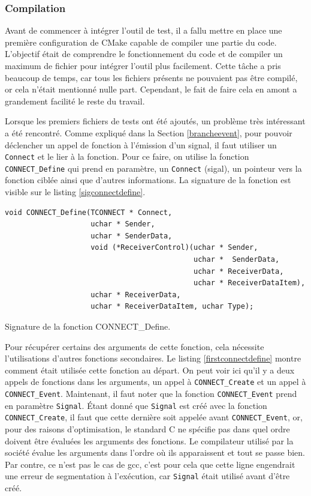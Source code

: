 \documentclass[a4paper]{article}
\begin{document}
\subsubsection*{Compilation}

Avant de commencer à intégrer l'outil de test, il a fallu mettre en place une
première configuration de CMake capable de compiler une partie du code.
L'objectif était de comprendre le fonctionnement du code et de compiler un
maximum de fichier pour intégrer l'outil plus facilement. Cette tâche a pris
beaucoup de temps, car tous les fichiers présents ne pouvaient pas être compilé,
or cela n'était mentionné nulle part. Cependant, le fait de faire cela en amont a
grandement facilité le reste du travail.

Lorsque les premiers fichiers de tests ont été ajoutés, un problème très
intéressant a été rencontré. Comme expliqué dans la Section \ref{brancheevent},
pour pouvoir déclencher un appel de fonction à l'émission d'un signal, il faut
utiliser un \verb|Connect| et le lier à la fonction. Pour ce faire, on utilise
la fonction \verb|CONNECT_Define| qui prend en paramètre, un \verb|Connect|
(sigal), un pointeur vers la fonction ciblée ainsi que d'autres informations. La
signature de la fonction est visible sur le listing \ref{sigconnectdefine}.

\begin{listing}[ht!]
\begin{verbatim}
void CONNECT_Define(TCONNECT * Connect,
                    uchar * Sender,
                    uchar * SenderData,
                    void (*ReceiverControl)(uchar * Sender,
                                            uchar *  SenderData,
                                            uchar * ReceiverData,
                                            uchar * ReceiverDataItem),
                    uchar * ReceiverData,
                    uchar * ReceiverDataItem, uchar Type);
\end{verbatim}
\caption{Signature de la fonction CONNECT\_Define.}
\label{sigconnectdefine}
\end{listing}

Pour récupérer certains des arguments de cette fonction, cela nécessite
l'utilisations d'autres fonctions secondaires. Le listing
\ref{firstconnectdefine} montre comment était utilisée cette fonction au départ.
On peut voir ici qu'il y a deux appels de fonctions dans les arguments, un appel
à \verb|CONNECT_Create| et un appel à \verb|CONNECT_Event|. Maintenant, il faut
noter que la fonction \verb|CONNECT_Event| prend en paramètre \verb|Signal|.
Étant donné que \verb|Signal| est créé avec la fonction \verb|CONNECT_Create|,
il faut que cette dernière soit appelée avant \verb|CONNECT_Event|, or, pour des
raisons d'optimisation, le standard C ne spécifie pas dans quel ordre doivent
être évaluées les arguments des fonctions. Le compilateur utilisé par la société
évalue les arguments dans l'ordre où ils apparaissent et tout se passe bien. Par
contre, ce n'est pas le cas de gcc, c'est pour cela que cette ligne engendrait
une erreur de segmentation à l'exécution, car \verb|Signal| était utilisé avant
d'être créé.
\end{document}
